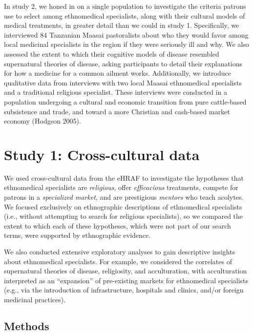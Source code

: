 \documentclass[
  11pt,
]{article}
\begin{document}
In study 2, we honed in on a single population to investigate the criteria patrons use to select among ethnomedical specialists, along with their cultural models of medical treatments, in greater detail than we could in study 1. Specifically, we interviewed 84 Tanzanian Maasai pastoralists about who they would favor among local medicinal specialists in the region if they were seriously ill and why. We also assessed the extent to which their cognitive models of disease resembled supernatural theories of disease, asking participants to detail their explanations for how a medicine for a common ailment works. Additionally, we introduce qualitative data from interviews with two local Maasai ethnomedical specialists and a traditional religious specialist. These interviews were conducted in a population undergoing a cultural and economic transition from pure cattle-based subsistence and trade, and toward a more Christian and cash-based market economy (Hodgson 2005).

\hypertarget{study-1-cross-cultural-data}{%
\section{Study 1: Cross-cultural data}\label{study-1-cross-cultural-data}}

We used cross-cultural data from the eHRAF to investigate the hypotheses that ethnomedical specialists are \emph{religious}, offer \emph{efficacious} treatments, compete for patrons in a \emph{specialized market}, and are prestigious \emph{mentors} who teach acolytes. We focused exclusively on ethnographic descriptions of ethnomedical specialists (i.e., without attempting to search for religious specialists), so we compared the extent to which each of these hypotheses, which were not part of our search terms, were supported by ethnographic evidence.

We also conducted extensive exploratory analyses to gain descriptive insights about ethnomedical specialists. For example, we considered the correlates of supernatural theories of disease, religiosity, and acculturation, with acculturation interpreted as an ``expansion'' of pre-existing markets for ethnomedical specialists (e.g., via the introduction of infrastructure, hospitals and clinics, and/or foreign medicinal practices).

\hypertarget{methods}{%
\subsection{Methods}\label{methods}}
\end{document}
